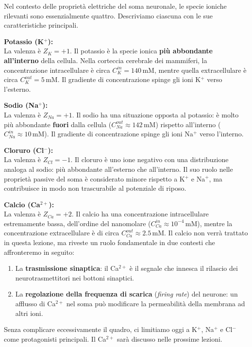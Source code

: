 Nel contesto delle proprietà elettriche del soma neuronale, le specie ioniche rilevanti sono essenzialmente quattro. Descriviamo ciascuna con le sue caratteristiche principali.

\textbf{Potassio (K$^+$):}\\
La valenza è $Z_K = +1$. Il potassio è la specie ionica \textbf{più abbondante all'interno} della cellula. Nella corteccia cerebrale dei mammiferi, la concentrazione intracellulare è circa $C_K^{in} = 140\,\text{mM}$, mentre quella extracellulare è circa $C_K^{out} = 5\,\text{mM}$. Il gradiente di concentrazione spinge gli ioni K$^+$ verso l'esterno.

\textbf{Sodio (Na$^+$):}\\
La valenza è $Z_{Na} = +1$. Il sodio ha una situazione opposta al potassio: è molto più abbondante \textbf{fuori} dalla cellula ($C_{Na}^{out} \approx 142\,\text{mM}$) rispetto all'interno ($C_{Na}^{in} \approx 10\,\text{mM}$). Il gradiente di concentrazione spinge gli ioni Na$^+$ verso l'interno.

\textbf{Cloruro (Cl$^-$):}\\
La valenza è $Z_{Cl} = -1$. Il cloruro è uno ione negativo con una distribuzione analoga al sodio: più abbondante all'esterno che all'interno. Il suo ruolo nelle proprietà passive del soma è considerato minore rispetto a K$^+$ e Na$^+$, ma contribuisce in modo non trascurabile al potenziale di riposo.

\textbf{Calcio (Ca$^{2+}$):}\\
La valenza è $Z_{Ca} = +2$. Il calcio ha una concentrazione intracellulare estremamente bassa, dell'ordine del nanomolare ($C_{Ca}^{in} \approx 10^{-4}\,\text{mM}$), mentre la concentrazione extracellulare è di circa $C_{Ca}^{out} \approx 2.5\,\text{mM}$. Il calcio non verrà trattato in questa lezione, ma riveste un ruolo fondamentale in due contesti che affronteremo in seguito:

\begin{enumerate}
    \item La \textbf{trasmissione sinaptica}: il Ca$^{2+}$ è il segnale che innesca il rilascio dei neurotrasmettitori nei bottoni sinaptici.
    \item La \textbf{regolazione della frequenza di scarica} (\textit{firing rate}) del neurone: un afflusso di Ca$^{2+}$ nel soma può modificare la permeabilità della membrana ad altri ioni.
\end{enumerate}

\begin{tcolorbox}[colback=gray!5, colframe=gray!40, arc=2mm, boxrule=0.5pt]
Senza complicare eccessivamente il quadro, ci limitiamo oggi a K$^+$, Na$^+$ e Cl$^-$ come protagonisti principali. Il Ca$^{2+}$ sarà discusso nelle prossime lezioni.
\end{tcolorbox}



